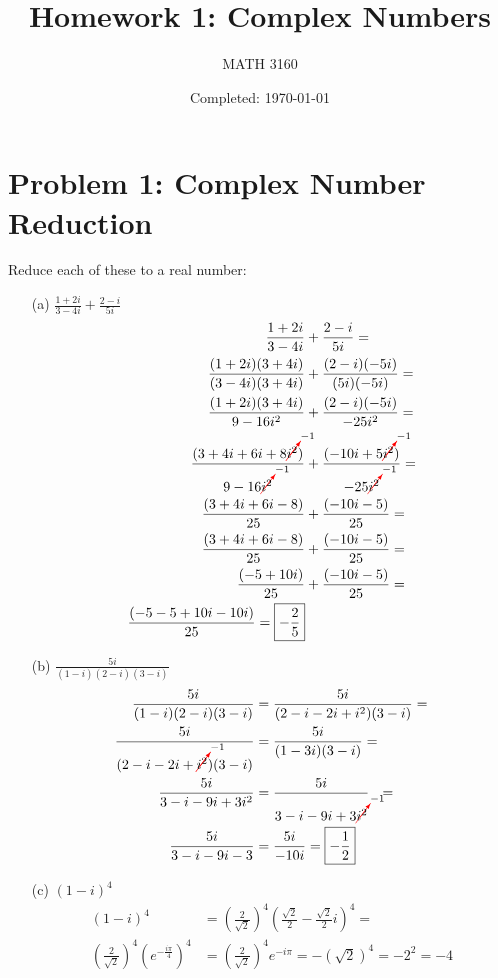 \documentclass{article}
\title{Homework 1: Complex Numbers}
\author{
  MATH 3160\\
  \myauthor
}
\date{Completed: \today}
\newcommand{\canceling}[2]{\textcolor{red}{\cancelto{\textcolor{black}{#1}}{\textcolor{black}{#2}}}}
\begin{document}
\maketitle %


\section*{Problem 1: Complex Number Reduction}
Reduce each of these to a real number:
\begin{enumerate}
\item[(a)] $ \frac{1+2i}{3-4i} + \frac{2-i}{5i}$
  \begin{align*}
    \frac{1+2i}{3-4i} &+ \frac{2-i}{5i} = \\
    \frac{(1+2i)(3+4i)}{(3-4i)(3+4i)} &+ \frac{(2-i)(-5i)}{(5i)(-5i)} = \\
    \frac{(1+2i)(3+4i)}{9-16i^2} &+ \frac{(2-i)(-5i)}{-25i^2} = \\
    \frac{(3+4i+6i+8\canceling{-1}{i^2})}{9-16\canceling{-1}{i^2}} &+ \frac{(-10i+5\canceling{-1}{i^2})}{-25\canceling{-1}{i^2}} = \\
    \frac{(3+4i+6i-8)}{25} &+ \frac{(-10i-5)}{25} = \\
    \frac{(3+4i+6i-8)}{25} &+ \frac{(-10i-5)}{25} = \\
    \frac{(-5+10i)}{25} &+ \frac{(-10i-5)}{25} = \\
    \frac{(-5-5+10i -10i)}{25} = \boxed{-\frac{2}{5}}\\
  \end{align*}
\item[(b)] $ \frac{5i}{(1-i)(2-i)(3-i)}$
  \begin{align*}
    \frac{5i}{(1-i)(2-i)(3-i)} &=  \frac{5i}{(2-i-2i+i^2)(3-i)} = \\
    \frac{5i}{(2-i-2i+\canceling{-1}{i^2})(3-i)} &= \frac{5i}{(1-3i)(3-i)} = \\
    \frac{5i}{3-i-9i+3i^2} &= \frac{5i}{3-i-9i+3\canceling{-1}{i^2}}\ \ =\\
    \frac{5i}{3-i-9i-3} &= \frac{5i}{-10i} = \boxed{-\frac{1}{2}}\\
  \end{align*}
  \item[(c)] $ (1-i)^4$
    \begin{align*}
      (1-i)^4 &= \left(\frac{2}{\sqrt{2}}\right)^4\left(\frac{\sqrt{2}}{2}-\frac{\sqrt{2}}{2}i\right)^4 = \\
      \left(\frac{2}{\sqrt{2}}\right)^4\left(e^{-\frac{i\pi}{4}}\right)^4 &= \left(\frac{2}{\sqrt{2}}\right)^4 e^{-i\pi} = -\left(\sqrt{2}\right)^4 =-2^2= \boxed{-4}
    \end{align*}
\end{enumerate}
\end{document}
